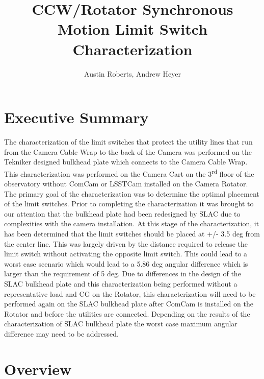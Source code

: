\documentclass[SE,lsstdraft,authoryear,toc]{lsstdoc}
\title{CCW/Rotator Synchronous Motion Limit Switch Characterization}
\author{%
Austin Roberts, Andrew Heyer
}
\date{\vcsDate}
\begin{document}
\maketitle

\hypertarget{executive-summary}{%
\section{Executive Summary}\label{executive-summary}}

The characterization of the limit switches that protect the utility
lines that run from the Camera Cable Wrap to the back of the Camera was
performed on the Tekniker designed bulkhead plate which connects to the
Camera Cable Wrap. This characterization was performed on the Camera
Cart on the 3\textsuperscript{rd} floor of the observatory without
ComCam or LSSTCam installed on the Camera Rotator. The primary goal of
the characterization was to determine the optimal placement of the limit
switches. Prior to completing the characterization it was brought to our
attention that the bulkhead plate had been redesigned by SLAC due to
complexities with the camera installation. At this stage of the
characterization, it has been determined that the limit switches should
be placed at +/- 3.5 deg from the center line. This was largely driven
by the distance required to release the limit switch without activating
the opposite limit switch. This could lead to a worst case scenario
which would lead to a 5.86 deg angular difference which is larger than
the requirement of 5 deg. Due to differences in the design of the SLAC
bulkhead plate and this characterization being performed without a
representative load and CG on the Rotator, this characterization will
need to be performed again on the SLAC bulkhead plate after ComCam is
installed on the Rotator and before the utilities are connected.
Depending on the results of the characterization of SLAC bulkhead plate
the worst case maximum angular difference may need to be addressed.

\hypertarget{overview}{%
\section{Overview}\label{overview}}
\end{document}
